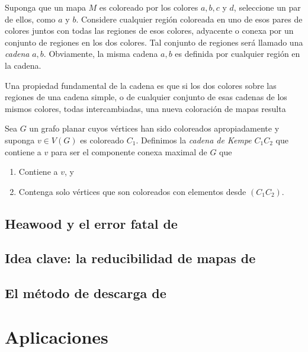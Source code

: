 \documentclass[3p,times,a4paper,twocolumn,authoryear]{elsarticle} %
\begin{document}
\begin{definition}
Suponga que un mapa $M$ es coloreado por los colores $a, b, c$ y $d$, seleccione un par de ellos, como $a$ y $b$. Considere cualquier región coloreada en uno de esos pares de colores juntos con todas las regiones de esos colores, adyacente o conexa por un conjunto de regiones en los dos colores. Tal conjunto de regiones será llamado una \emph{cadena} $a,b$. Obviamente, la misma cadena $a,b$ es definida por cualquier región en la cadena.

Una propiedad fundamental de la cadena es que si los dos colores sobre las regiones de una cadena simple, o de cualquier conjunto de esas cadenas de los mismos colores, todas intercambiadas, una nueva coloración de mapas resulta
\end{definition}

\begin{definition}
Sea $G$ un grafo planar cuyos vértices han sido coloreados apropiadamente y suponga $v\in V(G)$ es coloreado $C_1$. Definimos la \emph{cadena de Kempe} $C_1C_2$ que contiene a $v$ para ser el componente conexa maximal de $G$ que

\begin{enumerate}%
	\item Contiene a $v$, y
	\item Contenga solo vértices que son coloreados con elementos desde $(C_1C_2)$.
	\end{enumerate}
\end{definition}

\subsection{Heawood y el error fatal de \citeauthor{kempe}}

\subsection{Idea clave: la reducibilidad de mapas de \citeauthor{birkhoff}}

\subsection{El método de descarga de \citeauthor{appel}}

\section{Aplicaciones}
\end{document}
